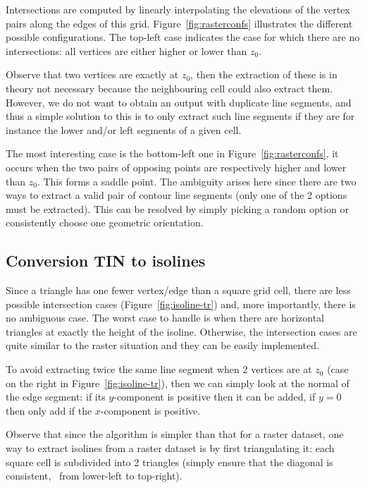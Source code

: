 Intersections are computed by linearly interpolating the elevations of the vertex pairs along the edges of this grid.
Figure~\ref{fig:rasterconfs} illustrates the different possible configurations. 
The top-left case indicates the case for which there are no intersections: all vertices are either higher or lower than $z_0$. 

Observe that two vertices are exactly at $z_0$, then the extraction of these is in theory not necessary because the neighbouring cell could also extract them. 
However, we do not want to obtain an output with duplicate line segments, and thus a simple solution to this is to only extract such line segments if they are for instance the lower and/or left segments of a given cell.

The most interesting case is the bottom-left one in Figure~\ref{fig:rasterconfs}, it occurs when the two pairs of opposing points are respectively higher and lower than $z_0$.
This forms a saddle point. 
The ambiguity arises here since there are two ways to extract a valid pair of contour line segments (only one of the 2 options must be extracted).
This can be resolved by simply picking a random option or consistently choose one geometric orientation. 


\subsection{Conversion TIN to isolines}
\label{sec:tin-iso}

Since a triangle has one fewer vertex/edge than a square grid cell, there are less possible intersection cases (Figure~\ref{fig:isoline-tr}) and, more importantly, there is no ambiguous case. 
The worst case to handle is when there are horizontal triangles at exactly the height of the isoline.
Otherwise, the intersection cases are quite similar to the raster situation and they can be easily implemented.

To avoid extracting twice the same line segment when 2 vertices are at $z_0$ (case on the right in Figure~\ref{fig:isoline-tr}), then we can simply look at the normal of the edge segment: if its $y$-component is positive then it can be added, if $y=0$ then only add if the $x$-component is positive.

Observe that since the algorithm is simpler than that for a raster dataset, one way to extract isolines from a raster dataset is by first triangulating it: each square cell is subdivided into 2 triangles (simply ensure that the diagonal is consistent, \eg\ from lower-left to top-right).


